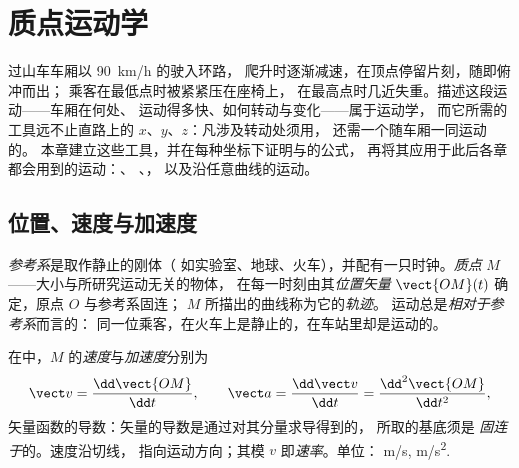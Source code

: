 \chapter{质点运动学}\label{ch:b1:point-kinematics}

过山车车厢以 \qty{90}{km/h} 的驶入环路，
爬升时逐渐减速，在顶点停留片刻，随即俯冲而出；
乘客在最低点时被紧紧压在座椅上，
在最高点时几近失重。描述这段运动——车厢在何处、
运动得多快、如何转动与变化——属于运动学，
而它所需的工具远不止直路上的 $x$、$y$、$z$：凡涉及转动处须用，
还需一个随车厢一同运动的。
本章建立这些工具，并在每种坐标下证明与的公式，
再将其应用于此后各章都会用到的运动：、
、，
以及沿任意曲线的运动。

\section{位置、速度与加速度}

\begin{definition}[参考系；位置；轨迹]\label{def:b1:point-kinematics:frame}
\emph{参考系}是取作静止的刚体（
如实验室、地球、火车），并配有一只时钟。\emph{质点}
$M$——大小与所研究运动无关的物体，
在每一时刻由其\emph{位置矢量}
$\vect{OM}(t)$ 确定，原点 $O$ 与参考系固连；
$M$ 所描出的曲线称为它的\emph{轨迹}。
运动总是\emph{相对于参考系}而言的：
同一位乘客，在火车上是静止的，在车站里却是运动的。
\end{definition}

\begin{definition}[速度与加速度]\label{def:b1:point-kinematics:velocity}
在中，$M$ 的\emph{速度}与\emph{加速度}分别为
\[
\vect v = \frac{\dd\vect{OM}}{\dd t}, \qquad
\vect a = \frac{\dd\vect v}{\dd t} = \frac{\dd^2\vect{OM}}{\dd t^2},
\]
矢量函数的导数：矢量的导数是通过对其分量求导得到的，
所取的基底须是
\emph{固连于}的。速度沿切线，
指向运动方向；其模 $v$ 即\emph{速率}。单位：
\unit{m/s}, \unit{m/s^2}.
\end{definition}

